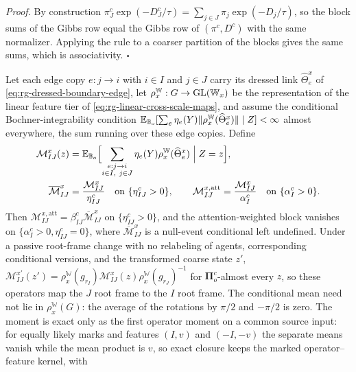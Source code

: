 \noindent\emph{Proof.}
By construction $\pi^c_J\exp(-D^c_J/\tau)=\sum_{j\in J}\pi_j\exp(-D_j/\tau)$, so the
block sums of the Gibbs row equal the Gibbs row of $(\pi^c,D^c)$ with the same
normalizer. Applying the rule to a coarser partition of the blocks gives the same
sums, which is associativity. $\square$

Let each edge copy $e:j\to i$ with $i\in I$ and $j\in J$ carry its dressed link
$\widehat\Theta^x_e$ of \eqref{eq:rg-dressed-boundary-edge}, let
$\rho^{\mathbb W}_x:G\to\mathrm{GL}(\mathbb W_x)$ be the representation of the linear feature tier of
\eqref{eq:rg-linear-cross-scale-maps}, and assume the conditional
Bochner-integrability condition
$\mathbb E_{\mathbb B_o}[\sum_e\eta_e(Y)\lVert\rho^{\mathbb W}_x(\widehat\Theta^x_e)\rVert\mid Z]<\infty$
almost everywhere, the sum running over these edge copies. Define
\begin{equation}
\begin{split}
\mathcal M^x_{IJ}(z)
&=\mathbb E_{\mathbb B_o}\Bigl[\sum_{\substack{e:j\to i\\ i\in I,\ j\in J}}\eta_e(Y)
\rho^{\mathbb W}_x(\widehat\Theta^x_e)\Bigm|Z=z\Bigr],\\
\overline{\mathcal M}^x_{IJ}&=\frac{\mathcal M^x_{IJ}}{\eta^c_{IJ}}
\quad\text{on }\{\eta^c_{IJ}>0\},
\qquad
\mathcal M^{x,\mathrm{att}}_{IJ}=\frac{\mathcal M^x_{IJ}}{\alpha^c_I}
\quad\text{on }\{\alpha^c_I>0\}.
\end{split}
\label{eq:rg-attention-hom-operator}
\end{equation}
Then $\mathcal M^{x,\mathrm{att}}_{IJ}=\beta^c_{IJ}\overline{\mathcal M}^x_{IJ}$ on
$\{\eta^c_{IJ}>0\}$, and the attention-weighted block vanishes on
$\{\alpha^c_I>0,\eta^c_{IJ}=0\}$, where $\overline{\mathcal M}^x_{IJ}$ is a
null-event conditional left undefined. Under a passive root-frame change with no
relabeling of agents, corresponding conditional versions, and the transformed coarse
state $z'$,
$\mathcal M^{x\prime}_{IJ}(z')=\rho^{\mathbb W}_x(g_{r_I})\mathcal M^x_{IJ}(z)\rho^{\mathbb W}_x(g_{r_J})^{-1}$
for $\boldsymbol\Pi^c_o$-almost every $z$, so these operators map the $J$ root frame
to the $I$ root frame. The conditional mean need not lie in $\rho^{\mathbb W}_x(G)$: the average
of the rotations by $\pi/2$ and $-\pi/2$ is zero. The moment is exact only as the
first operator moment on a common source input: for equally likely marks and
features $(I,v)$ and $(-I,-v)$ the separate means vanish while the mean product is
$v$, so exact closure keeps the marked operator--feature kernel, with
